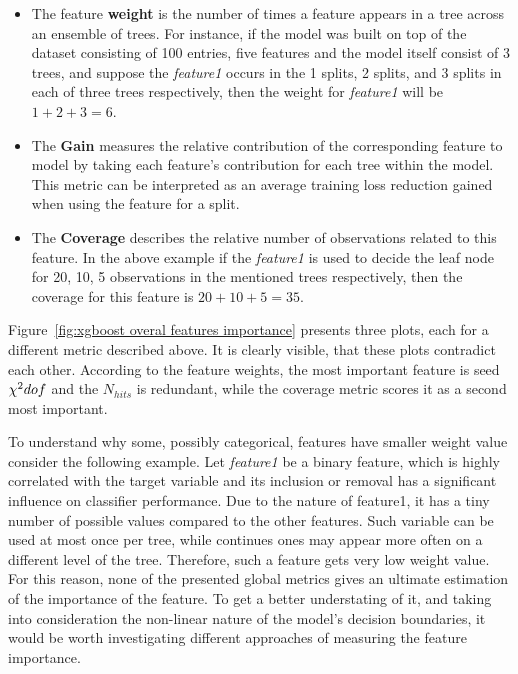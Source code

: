 \begin{itemize}
    \item The feature \textbf{weight} is the number of times a feature appears in a tree across an ensemble of trees. For instance, if the model was built on top of the dataset consisting  of 100 entries, five features and the model itself consist of 3 trees, and suppose the \textit{feature1} occurs in the 1 splits, 2 splits, and 3 splits in each of three trees respectively, then the weight for \textit{feature1} will be $1+2+3=6$.   
    \item The \textbf{Gain} measures the relative contribution of the corresponding feature to model by taking each feature's contribution for each tree within the model. This metric can be interpreted as an average training loss reduction gained when using the feature for a split. 
    \item The \textbf{Coverage} describes the relative number of observations related to this feature. In the above example if the \textit{feature1} is used to decide the leaf node for 20, 10, 5 observations in the mentioned trees respectively, then the coverage for this feature is $20+10+5 = 35$.   
\end{itemize}

Figure~\ref{fig:xgboost overal features importance} presents three plots, each for a different metric described above. It is clearly visible, that these plots contradict each other. According to the feature weights, the most important feature is seed $\chi^2\/dof$ and the $N_{hits}$ is redundant, while the coverage metric scores it as a second most important.

To understand why some, possibly categorical, features have smaller weight value consider the following example. Let \textit{feature1} be a binary feature, which is highly correlated with the target variable and its inclusion or removal has a significant influence on classifier performance. Due to the nature of feature1, it has a tiny number of possible values compared to the other features. Such variable can be used at most once per tree, while continues ones may appear more often on a different level of the tree. Therefore, such a feature gets very low weight value. 
For this reason, none of the presented global metrics gives an ultimate estimation of the importance of the feature. To get a better understating of it, and taking into consideration the non-linear nature of the model's decision boundaries, it would be worth investigating different approaches of measuring the feature importance.  

